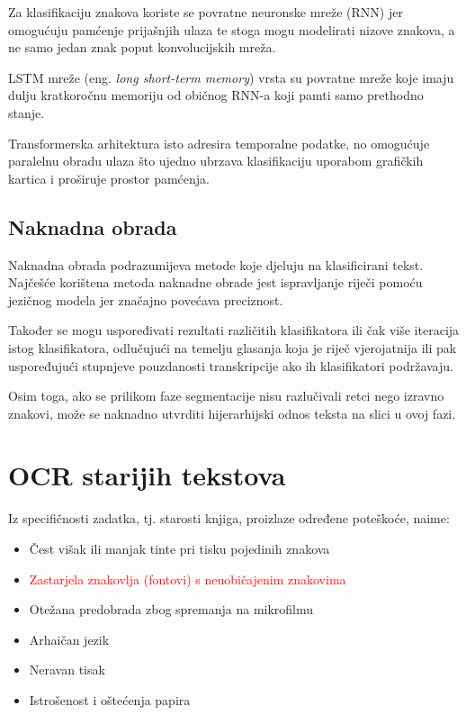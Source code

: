 \documentclass[zavrsnirad]{fer}
\begin{document}
Za klasifikaciju znakova koriste se povratne neuronske mreže (RNN) jer omogućuju pamćenje prijašnjih ulaza te stoga mogu modelirati nizove znakova, a ne samo jedan znak poput konvolucijskih mreža.

LSTM mreže \cite{Breuel2013} (eng. \textit{long short-term memory}) vrsta su povratne mreže koje imaju dulju kratkoročnu memoriju od običnog RNN-a koji pamti samo prethodno stanje.

Transformerska arhitektura \cite{Vaswani2023} isto adresira temporalne podatke, no omogućuje paralelnu obradu ulaza što ujedno ubrzava klasifikaciju uporabom grafičkih kartica i proširuje prostor pamćenja.

\section{Naknadna obrada}

Naknadna obrada podrazumijeva metode koje djeluju na klasificirani tekst. Najčešće korištena metoda naknadne obrade jest ispravljanje riječi pomoću jezičnog modela jer značajno povećava preciznost.

Također se mogu uspoređivati rezultati različitih klasifikatora ili čak više iteracija istog klasifikatora, odlučujući na temelju glasanja koja je riječ vjerojatnija ili pak uspoređujući stupnjeve pouzdanosti transkripcije ako ih klasifikatori podržavaju. \cite{Boiangiu2016}

Osim toga, ako se prilikom faze segmentacije nisu razlučivali retci nego izravno znakovi, može se naknadno utvrditi hijerarhijski odnos teksta na slici u ovoj fazi.

\chapter{OCR starijih tekstova}
\label{pog:ocr_starijih_tekstova}

Iz specifičnosti zadatka, tj. starosti knjiga,  proizlaze određene poteškoće, naime:
\begin{itemize}
	\item Čest višak ili manjak tinte pri tisku pojedinih znakova
	\item \textcolor{red}{Zastarjela znakovlja (fontovi) s neuobičajenim znakovima} %
	\item Otežana predobrada zbog spremanja na mikrofilmu
	\item Arhaičan jezik
	\item Neravan tisak
	\item Istrošenost i oštećenja papira
\end{itemize}
\end{document}
